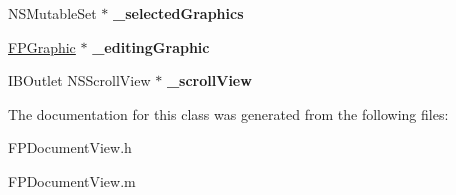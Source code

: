 \begin{DoxyCompactItemize}
N\+S\+Mutable\+Set $\ast$ {\bfseries \+\_\+selected\+Graphics}
\item 
\mbox{\label{interface_f_p_document_view_aa5f6e65466e0b4d4a26730718d743b79}} 
\mbox{\hyperlink{interface_f_p_graphic}{F\+P\+Graphic}} $\ast$ {\bfseries \+\_\+editing\+Graphic}
\item 
\mbox{\label{interface_f_p_document_view_a849e2f6421c0397e33fb53ca9d1c07b3}} 
I\+B\+Outlet N\+S\+Scroll\+View $\ast$ {\bfseries \+\_\+scroll\+View}
\end{DoxyCompactItemize}


The documentation for this class was generated from the following files\+:\begin{DoxyCompactItemize}
\item 
F\+P\+Document\+View.\+h\item 
F\+P\+Document\+View.\+m\end{DoxyCompactItemize}
